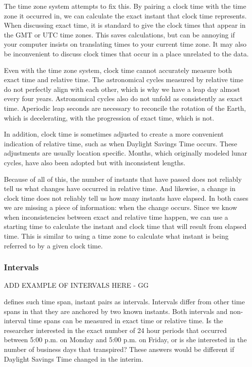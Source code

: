 \documentclass[article]{jss}
\begin{document}
The time zone system attempts to fix this.  By pairing a clock time with the time zone it occurred in, we can calculate the exact instant that clock time represents. When discussing exact time, it is standard to give the clock times that appear in the GMT or UTC time zones.  This saves calculations, but can be annoying if your computer insists on translating times to your current time zone.  It may also be inconvenient to discuss clock times that occur in a place unrelated to the data.

Even with the time zone system, clock time cannot accurately measure both exact time and relative time. The astronomical cycles measured by relative time do not perfectly align with each other, which is why we have a leap day almost every four years. Astronomical cycles also do not unfold as consistently as exact time. Aperiodic leap seconds are necessary to reconcile the rotation of the Earth, which is decelerating, with the progression of exact time, which is not.

In addition, clock time is sometimes adjusted to create a more convenient indication of relative time, such as when Daylight Savings Time occurs.  These adjustments are usually location specific. Months, which originally modeled lunar cycles, have also been adopted but with inconsistent lengths.

Because of all of this, the number of instants that have passed does not reliably tell us what changes have occurred in relative time. And likewise, a change in clock time does not reliably tell us how many instants have elapsed. In both cases we are missing a piece of information: when the change occurs. Since we know when inconsistencies between exact and relative time happen, we can use a starting time to calculate the instant and clock time that will result from elapsed time. This is similar to using a time zone to calculate what instant is being referred to by a given clock time.

\subsubsection{Intervals}

ADD EXAMPLE OF INTERVALS HERE - GG

 defines such time span, instant pairs as intervals. Intervals differ from other time spans in that they are anchored by two known instants. Both intervals and non-interval time spans can be measured in exact time or relative time. Is the researcher interested in the exact number of 24 hour periods that occurred between 5:00 p.m. on Monday and 5:00 p.m. on Friday, or is she interested in the number of business days that transpired? These answers would be different if Daylight Savings Time changed in the interim.
\end{document}
